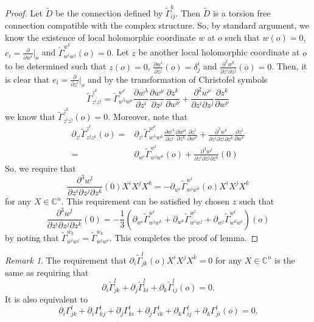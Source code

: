 \documentclass[12pt]{amsart}
\def\p{\partial}
\newcommand\C{{\mathbb C}}
\theoremstyle{definition}
\theoremstyle{remark}
\newtheorem{rem}{Remark}
\numberwithin{equation}{section}
\begin{document}
\begin{proof}
Let $\tilde D$ be the connection defined by $\tilde \Gamma_{ij}^k$. Then $\tilde D$ is a torsion free connection compatible with the complex structure. So, by standard argument, we know the existence of local holomorphic coordinate $w$ at $o$ such that $w(o)=0$, $e_i=\frac{\p}{\p w^i}\big|_o$ and $\tilde\Gamma_{w^iw^j}^{w^k}(o)=0$. Let $z$ be another local holomorphic coordinate at $o$ to be determined such that $z(o)=0$, $\frac{\p w^i}{\p z^j}(o)=\delta_j^i$ and $\frac{\p^2 w^k}{\p z^i\p z^j}(o)=0$. Then, it is clear that $e_i=\frac{\p}{\p z^i}\big|_o$ and by the transformation of Christofel symbols
\begin{equation}
\tilde\Gamma_{z^iz^j}^{z^k}=\tilde\Gamma_{w^\lambda w^\mu}^{w^\nu}\frac{\p w^\lambda}{\p z^i}\frac{\p w^\mu}{\p z^j}\frac{\p z^k}{\p w^\nu}+\frac{\p^2w^\nu}{\p z^i\p z^j}\frac{\p z^k}{\p w^\nu}
\end{equation}
we know that $\tilde \Gamma_{z^iz^j}^{z^k}(o)=0$. Moreover, note that
\begin{equation}
\begin{split}
\p_{z^i}\tilde\Gamma_{z^jz^k}^{z^l}(o)=&\p_{z^i}\tilde\Gamma_{w^\lambda w^\mu}^{w^\nu}\frac{\p w^\lambda}{\p z^j}\frac{\p w^\mu}{\p z^k}\frac{\p z^l}{\p w^\nu}+\frac{\p^3w^\nu}{\p z^i\p z^j\p z^k}\frac{\p z^l}{\p w^\nu}\\
=&\p_{w^i}\tilde\Gamma_{w^j w^k}^{w^l}(o)+\frac{\p^3w^l}{\p z^i\p z^j\p z^k}(0)
\end{split}
\end{equation}
So, we require that
\begin{equation}
\frac{\p^3w^l}{\p z^i\p z^j\p z^k}(0)X^iX^jX^k=-\p_{w^i}\tilde\Gamma_{w^j w^k}^{w^l}(o)X^iX^jX^k
\end{equation}
for any $X\in \C^n$. This requirement can  be satisfied by chosen $z$ such that
\begin{equation}
\frac{\p^3w^l}{\p z^i\p z^j\p z^k}(0)=-\frac13\left(\p_{w^i}\tilde\Gamma_{w^j w^k}^{w^l}+\p_{w^k}\tilde\Gamma_{w^i w^j}^{w^l}+\p_{w^j}\tilde\Gamma_{w^k w^i}^{w^l}\right)(o)
\end{equation}
by noting that $\tilde\Gamma_{w^iw^j}^{w_k}=\tilde\Gamma_{w^jw^i}^{w_k}$. This completes the proof of lemma.
\end{proof}
\begin{rem}
The requirement that $\p_i\tilde\Gamma_{jk}^l(o)X^iX^jX^k=0$ for any $X\in \C^n$ is the same as requiring that
\begin{equation}
\p_i\tilde\Gamma_{jk}^l+\p_j\tilde\Gamma_{ki}^l+\p_k\tilde\Gamma_{ij}^l(o)=0.
\end{equation}
It is also equivalent to
\begin{equation}
\p_i\Gamma_{jk}^l+\p_i\Gamma_{kj}^l+\p_j\Gamma_{ki}^l+\p_j\Gamma_{ik}^l+\p_k\Gamma_{ij}^l+\p_k\Gamma_{ji}^l(o)=0.
\end{equation}

\end{rem}
\end{document}
